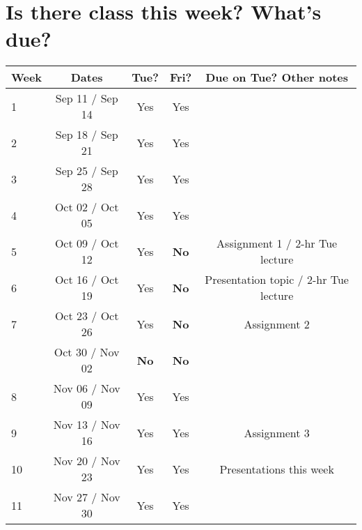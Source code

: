 \documentclass{article}
\begin{document}
\section*{Is there class this week? What's due?}

\begin{table}[H]
\begin{center}
\begin{tabular}{lcccc}
Week & Dates &  \quad Tue? \quad & \quad Fri? \quad & \quad Due on Tue? Other notes\\
\hline
\hline
1 & Sep 11 / Sep 14 & Yes & Yes & \\ %
2 & Sep 18 / Sep 21 & Yes & Yes & \\ %
3 & Sep 25 / Sep 28 & Yes & Yes & \\ %
4 & Oct 02 / Oct 05 & Yes & Yes & \\ %
5 & Oct 09 / Oct 12 & Yes & {\bf No} & Assignment 1 / 2-hr Tue lecture \\ %
6 & Oct 16 / Oct 19 & Yes & {\bf No} & Presentation topic  / 2-hr Tue lecture \\ %
7 & Oct 23 / Oct 26 & Yes & {\bf No} & Assignment 2 \\ %
 & Oct 30 / Nov 02 & {\bf No} & {\bf No} & \\ 
8 & Nov 06 / Nov 09 & Yes & Yes & \\ %
9 & Nov 13 / Nov 16 & Yes & Yes &  Assignment 3 \\ %
10 & Nov 20 / Nov 23 & Yes & Yes & Presentations this week\\ 
11 & Nov 27 / Nov 30 & Yes & Yes %
\end{tabular}
\end{center}
\end{table}
\end{document}

